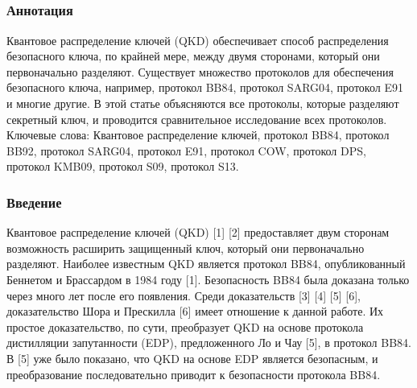 \subsection{\trnas}
\subsubsection*{Аннотация}

Квантовое распределение ключей (QKD) обеспечивает способ распределения безопасного ключа, по крайней мере, между двумя сторонами, который они первоначально разделяют. Существует множество протоколов для обеспечения безопасного ключа, например, протокол BB84, протокол SARG04, протокол E91 и многие другие. В этой статье объясняются все протоколы, которые разделяют секретный ключ, и проводится сравнительное исследование всех протоколов.
Ключевые слова: Квантовое распределение ключей, протокол BB84, протокол BB92, протокол SARG04, протокол E91, протокол COW, протокол DPS, протокол KMB09, протокол S09, протокол S13.

\subsubsection{Введение}

Квантовое распределение ключей (QKD) [1] [2] предоставляет двум сторонам возможность расширить защищенный ключ, который они первоначально разделяют. Наиболее известным QKD является протокол BB84, опубликованный Беннетом и Брассардом в 1984 году [1]. Безопасность BB84 была доказана только через много лет после его появления. Среди доказательств [3] [4] [5] [6], доказательство Шора и Прескилла [6] имеет отношение к данной работе. Их простое доказательство, по сути, преобразует QKD на основе протокола дистилляции запутанности (EDP), предложенного Ло и Чау [5], в протокол BB84. В [5] уже было показано, что QKD на основе EDP является безопасным, и преобразование последовательно приводит к безопасности протокола BB84.

